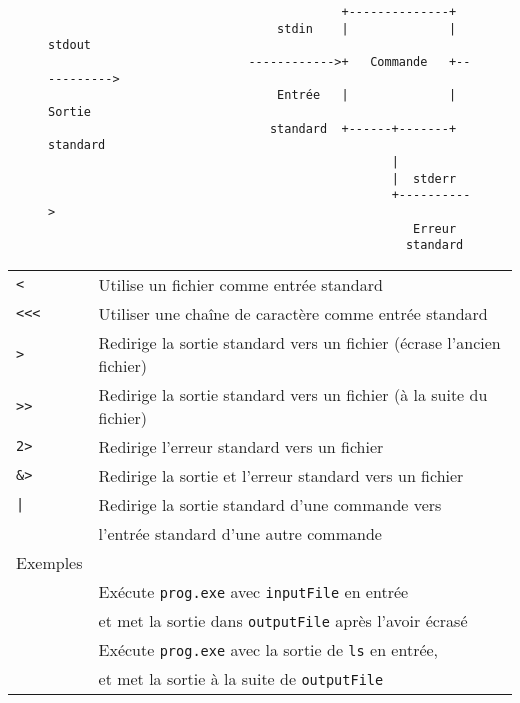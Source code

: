 \documentclass [a4paper]{article}
\begin{document}
\begin{figure}[h!]
\begin{verbatim}
                                         +--------------+
                                stdin    |              |   stdout
                            ------------>+   Commande   +----------->
                                Entrée   |              |   Sortie
                               standard  +------+-------+  standard
                                                |
                                                |  stderr
                                                +---------->
                                                   Erreur
                                                  standard
\end{verbatim}
\end{figure}
\noindent
\begin{tabular}{ ll }
\hline
{\verb+<+}                       & Utilise un fichier comme entrée standard \\
{\verb+<<<+}                     & Utiliser une chaîne de caractère comme entrée standard \\
{\verb+>+}                       & Redirige la sortie standard vers un fichier (écrase l'ancien fichier) \\
{\verb+>>+}                      & Redirige la sortie standard vers un fichier (à la suite du fichier) \\
{\verb+2>+}                      & Redirige l'erreur standard vers un fichier \\
{\verb+&>+}                      & Redirige la sortie et l'erreur standard vers un fichier \\
{\verb+|+}                       & Redirige la sortie standard d'une commande vers \\
                                 & l'entrée standard d'une autre commande  \\
\hline
{Exemples}                                                   & \\
\hspace{0.5cm}{\verb+./prog.exe < inputFile > outputFile+}   & Exécute \verb+prog.exe+ avec \verb+inputFile+ en entrée \\
                                                             & et met la sortie dans \verb+outputFile+ après l'avoir écrasé \\
\hspace{0.5cm}{\verb+ls | ./prog.exe >> outputFile+}         & Exécute \verb+prog.exe+ avec la sortie de \verb+ls+ en entrée, \\
                                                             & et met la sortie à la suite de \verb+outputFile+ \\
\hline
\end{tabular}
\end{document}
